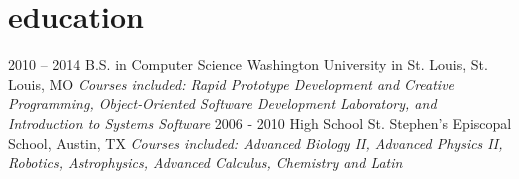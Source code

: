 \documentclass[]{cv}
\begin{document}
\section{education}

\begin{entrylist}
  \entry
    {2010 – 2014}
    {B.S. in Computer Science}
    {Washington University in St. Louis, St. Louis, MO}
    {\emph{Courses included: Rapid Prototype Development and Creative Programming, Object‐Oriented Software Development Laboratory, and Introduction to Systems Software}}
  \entry
    {2006 - 2010}
    {High School}
    {St. Stephen’s Episcopal School, Austin, TX}
    {\emph{Courses included: Advanced Biology II, Advanced Physics II, Robotics, Astrophysics, Advanced Calculus, Chemistry and Latin}}
\end{entrylist}
\end{document}
